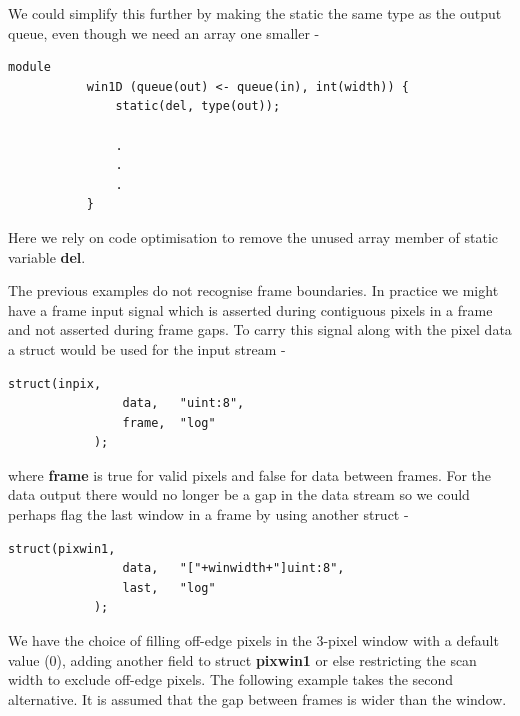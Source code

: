         We could simplify this further by making the static the same type as
        the output queue, even though we need an array one smaller -
        \begin{lstlisting}[gobble=8, language=threepl]
           module
           win1D (queue(out) <- queue(in), int(width)) {
               static(del, type(out));
               
               .
               .
               .
           }        
        \end{lstlisting}
        Here we rely on code optimisation to remove the unused array member
        of static variable {\bf del}.
        
        The previous examples do not recognise frame boundaries.
        In practice we might have a frame input signal which is asserted
        during contiguous pixels in a frame and not asserted during frame
        gaps. To carry this signal along with the pixel data a struct would
        be used for the input stream -
        \begin{lstlisting}[gobble=8, language=threepl]
            struct(inpix,
                data,   "uint:8",
                frame,  "log"
            );
        \end{lstlisting}
        where {\bf frame} is true for valid pixels and false for data
        between frames. For the data output there would no longer be a gap
        in the data stream so we could perhaps flag the last window in a frame
        by using another struct -
        \begin{lstlisting}[gobble=8, language=threepl]
            struct(pixwin1,
                data,   "["+winwidth+"]uint:8",
                last,   "log"
            );
        \end{lstlisting}
        We have the choice of filling off-edge pixels in the 3-pixel window with
        a default value (0), adding another field to struct {\bf pixwin1} or
        else restricting the scan width to exclude off-edge pixels. The
        following example takes the second alternative. It is assumed that the
        gap between frames is wider than the window.
                          
